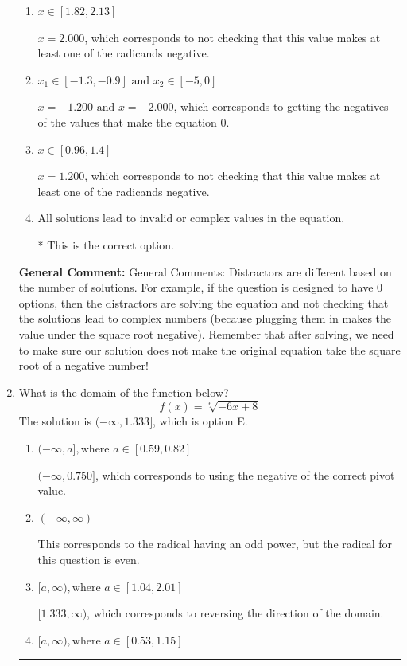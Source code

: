\documentclass{extbook}[14pt]
\newcommand{\litem}[1]{\item #1

\rule{\textwidth}{0.4pt}}
\begin{document}
\begin{enumerate}
{\begin{enumerate}[label=\Alph*.]
$x = 1.200 \text{ and } x = 2.000$, which corresponds to not checking that BOTH values make at least one of the radicands negative.
\item \( x \in [1.82,2.13] \)

$x = 2.000$, which corresponds to not checking that this value makes at least one of the radicands negative.
\item \( x_1 \in [-1.3, -0.9] \text{ and } x_2 \in [-5,0] \)

$x = -1.200 \text{ and } x = -2.000$, which corresponds to getting the negatives of the values that make the equation 0.
\item \( x \in [0.96,1.4] \)

$x = 1.200$, which corresponds to not checking that this value makes at least one of the radicands negative.
\item \( \text{All solutions lead to invalid or complex values in the equation.} \)

* This is the correct option.
\end{enumerate}

\textbf{General Comment:} General Comments: Distractors are different based on the number of solutions. For example, if the question is designed to have 0 options, then the distractors are solving the equation and not checking that the solutions lead to complex numbers (because plugging them in makes the value under the square root negative). Remember that after solving, we need to make sure our solution does not make the original equation take the square root of a negative number!
}
\litem{
What is the domain of the function below?
\[ f(x) = \sqrt[6]{-6 x + 8} \]
The solution is \( (-\infty, 1.333] \), which is option E.\begin{enumerate}[label=\Alph*.]
\item \( (-\infty, a], \text{where } a \in [0.59, 0.82] \)

$(-\infty, 0.750]$, which corresponds to using the negative of the correct pivot value.
\item \( (-\infty, \infty) \)

This corresponds to the radical having an odd power, but the radical for this question is even.
\item \( [a, \infty), \text{where } a \in [1.04, 2.01] \)

 $[1.333, \infty)$, which corresponds to reversing the direction of the domain.
\item \( [a, \infty), \text{where } a \in [0.53, 1.15] \)


\end{enumerate}}
\end{enumerate}
\end{document}
